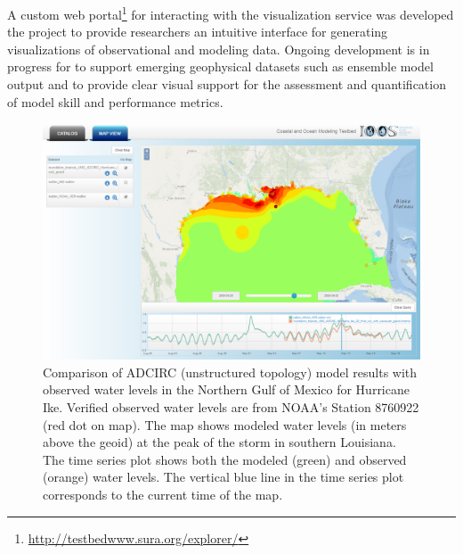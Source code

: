 A custom web
portal\footnote{\url{http://testbedwww.sura.org/explorer/}} for
interacting with the \sciwms{} visualization service was developed the
\comt{} \ioos{} project to provide researchers an intuitive interface
for generating visualizations of observational and modeling data.
Ongoing development is in progress for \sciwms{} to support emerging
geophysical datasets such as ensemble model output and to provide
clear visual support for the assessment and quantification of model
skill and performance metrics.

\begin{figure}[ht!]
  \centering
  \includegraphics[width=\columnwidth]{../figs/SciWMS_ModelObsComparison}
  \caption{Comparison of ADCIRC (unstructured topology) model results
    with observed water levels in the Northern Gulf of Mexico for
    Hurricane Ike. Verified observed water levels are from NOAA's
    Station 8760922 (red dot on map). The map shows modeled water
    levels (in meters above the geoid) at the peak of the storm in
    southern Louisiana. The time series plot shows both the modeled
    (green) and observed (orange) water levels. The vertical blue line
    in the time series plot corresponds to the current time of the
    map.}
  \label{fig:adcirc_comp}
\end{figure}

